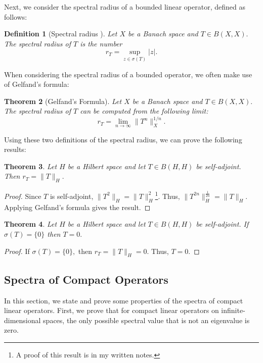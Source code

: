 \documentclass[12pt,a4paper]{article}
\theoremstyle{boldthm}
\newtheorem{theorem}{Theorem}[section]
\theoremstyle{bolddefn}
\newtheorem{definition}[theorem]{Definition}
\begin{document}
Next, we consider the spectral radius of a bounded linear operator, defined as follows:
\begin{definition}[Spectral radius \cite{umberto}]
    Let $X$ be a Banach space and $T \in B(X, X).$ The spectral radius of $T$ is the number 
    \begin{equation}
        r_T = \sup_{z \in \sigma(T)} |z|.
    \end{equation}
\end{definition}
When considering the spectral radius of a bounded operator, we often make use of Gelfand's formula:
\begin{theorem}[Gelfand's Formula] \label{gel}
    Let $X$ be a Banach space and $T \in B(X, X).$ The spectral radius of $T$ can be computed from the following limit:
    \begin{equation}
        r_T = \lim_{n \rightarrow \infty} \| T^n \|_X^{1/n}.
    \end{equation}
\end{theorem}
Using these two definitions of the spectral radius, we can prove the following results:
\begin{theorem}
    Let $H$ be a Hilbert space and let $T \in B(H, H)$ be self-adjoint. Then $r_T = \| T \|_H.$
\end{theorem}
\begin{proof}
    Since $T$ is self-adjoint, $\|T^2 \|_H = \|T\|_H^2$\footnote{A proof of this result is in my written notes.}. Thus, $\|T^{2n}\|_H^{\frac{1}{2n}} = \| T \|_H.$ Applying Gelfand's formula gives the result.
\end{proof}
\begin{theorem}
   Let $H$ be a Hilbert space and let $T \in B(H, H)$ be self-adjoint. If $\sigma(T) = \{0\}$ then $T = 0.$
\end{theorem}
\begin{proof}
    If $\sigma(T) = \{0\},$ then $r_T = \| T \|_H = 0.$ Thus, $T=0.$
\end{proof}





\subsection{Spectra of Compact Operators}

In this section, we state and prove some properties of the spectra of compact linear operators. First, we prove that for compact linear operators on infinite-dimensional spaces, the only possible spectral value that is not an eigenvalue is zero.
\end{document}
